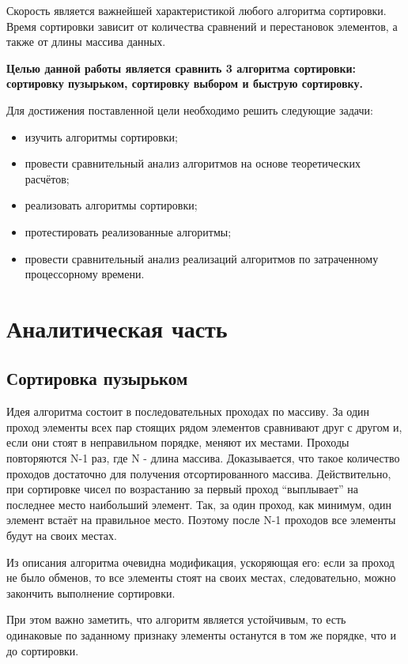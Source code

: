 \documentclass{report}
\begin{document}
Скорость является важнейшей характеристикой любого алгоритма сортировки. Время сортировки зависит от количества сравнений и перестановок элементов, а также от длины массива данных. 

\textbf{Целью данной работы является сравнить 3 алгоритма сортировки: сортировку пузырьком, сортировку выбором и быструю сортировку.} 

Для достижения поставленной цели необходимо решить следующие задачи:
\begin{itemize}
\item изучить алгоритмы сортировки;
\item провести сравнительный анализ алгоритмов на основе теоретических расчётов;
\item реализовать алгоритмы сортировки;
\item протестировать реализованные алгоритмы;
\item провести сравнительный анализ реализаций алгоритмов по затраченному процессорному времени.
\end{itemize}


\chapter{Аналитическая часть}

\section{Сортировка пузырьком}

Идея алгоритма состоит в последовательных проходах по массиву. За один проход элементы всех пар стоящих рядом элементов сравнивают друг с другом и, если они стоят в неправильном порядке, меняют их местами. Проходы повторяются N-1 раз, где N - длина массива. Доказывается, что такое количество проходов достаточно для получения отсортированного массива. Действительно, при сортировке чисел по возрастанию за первый проход ``выплывает'' на последнее место наибольший элемент. Так, за один проход, как минимум, один элемент встаёт на правильное место. Поэтому после N-1 проходов все элементы будут на своих местах. 

Из описания алгоритма очевидна модификация, ускоряющая его: если за проход не было обменов, то все элементы стоят на своих местах, следовательно, можно закончить выполнение сортировки. 

При этом важно заметить, что алгоритм является устойчивым, то есть одинаковые по заданному признаку элементы останутся в том же порядке, что и до сортировки.
\end{document}
